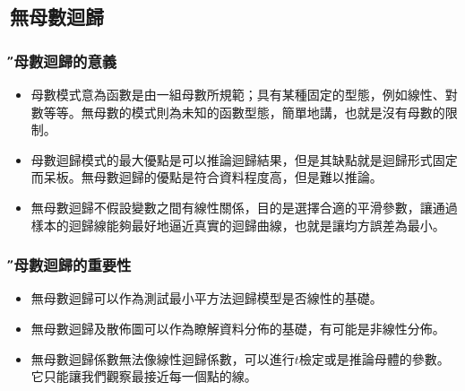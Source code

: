\documentclass[xcolor=dvipsnames]{beamer}
\begin{document}
\subsection{無母數迴歸}
\begin{frame}\frametitle{\H 無母數迴歸的意義}
\begin{itemize}
\item 母數模式意為函數是由一組母數所規範；具有某種固定的型態，例如線性、對數等等。無母數的模式則為未知的函數型態，簡單地講，也就是沒有母數的限制。
\item 母數迴歸模式的最大優點是可以推論迴歸結果，但是其缺點就是迴歸形式固定而呆板。無母數迴歸的優點是符合資料程度高，但是難以推論。
\item 無母數迴歸不假設變數之間有線性關係，目的是選擇合適的平滑參數，讓通過樣本的迴歸線能夠最好地逼近真實的迴歸曲線，也就是讓均方誤差為最小。
\end{itemize}
\end{frame}
\begin{frame}\frametitle{\H 無母數迴歸的重要性}
\begin{itemize}
\item 無母數迴歸可以作為測試最小平方法迴歸模型是否線性的基礎。
\item 無母數迴歸及散佈圖可以作為瞭解資料分佈的基礎，有可能是非線性分佈。
\item 無母數迴歸係數無法像線性迴歸係數，可以進行$t$檢定或是推論母體的參數。它只能讓我們觀察最接近每一個點的線。
\end{itemize}
\end{frame}
\end{document}
